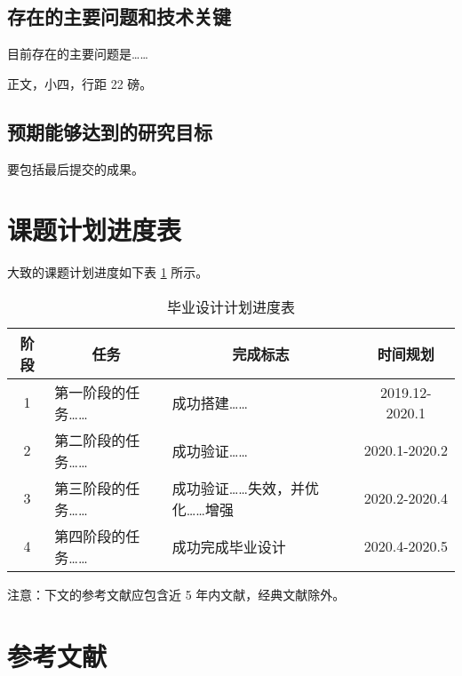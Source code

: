 \documentclass[proposal-report]{bitart}
\begin{document}
\subsection{存在的主要问题和技术关键}
目前存在的主要问题是……

正文，小四，行距 22 磅。

\subsection{预期能够达到的研究目标}
要包括最后提交的成果。

\section{课题计划进度表}
大致的课题计划进度如下表 \ref{tab:progress} 所示。

\begin{table}[!ht]
  \centering
  \caption{毕业设计计划进度表}
  \label{tab:progress}
  \begin{tabular}{@{}cllc@{}}
    \toprule
    阶段 & \multicolumn{1}{c}{任务} & \multicolumn{1}{c}{完成标志} & 时间规划       \\ \midrule
    1    & 第一阶段的任务……          & 成功搭建……                    & 2019.12-2020.1 \\ \midrule
    2    & 第二阶段的任务……          & 成功验证……                    & 2020.1-2020.2  \\ \midrule
    3    & 第三阶段的任务……          & 成功验证……失效，并优化……增强  & 2020.2-2020.4  \\ \midrule
    4    & 第四阶段的任务……          & 成功完成毕业设计              & 2020.4-2020.5  \\ \bottomrule
  \end{tabular}
\end{table}

注意：下文的参考文献应包含近 5 年内文献，经典文献除外。

\section{参考文献}
\printbibliography[heading=none]
\end{document}
